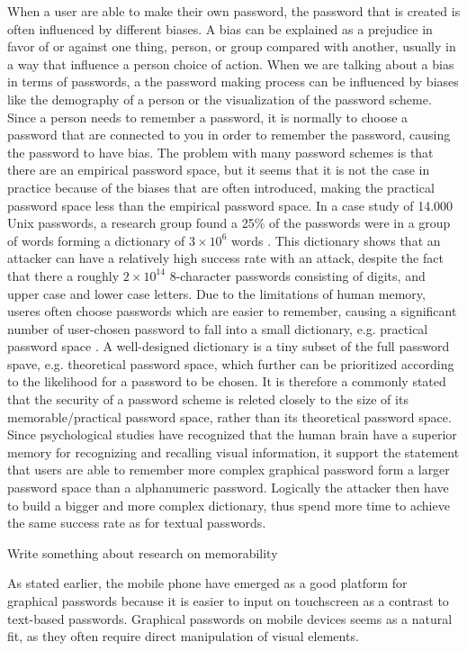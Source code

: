     When a user are able to make their own password, the password that is created is often influenced by different biases. A bias can be explained as a prejudice in favor of or against one thing, person, or group compared with another, usually in a way that influence a person choice of action. When we are talking about a bias in terms of passwords, a the password making process can be influenced by biases like the demography of a person or the visualization of the password scheme. Since a person needs to remember a password, it is normally to choose a password that are connected to you in order to remember the password, causing the password to have bias. The problem with many password schemes is that there are an empirical password space, but it seems that it is not the case in practice because of the biases that are often introduced, making the practical password space less than the empirical password space. In a case study of 14.000 Unix passwords, a research group found a 25\% of the passwords were in a group of words forming a dictionary of $3\times10^{6}$ words \cite{UnixPasswords}. This dictionary shows that an attacker can have a relatively high success rate with an attack, despite the fact that there a roughly $2\times10^{14}$ 8-character passwords consisting of digits, and upper case and lower case letters. Due to the limitations of human memory, useres often choose passwords which are easier to remember, causing a significant number of user-chosen password to fall into a small dictionary, e.g. practical password space \cite{Tao}. A well-designed dictionary is a tiny subset of the full password spave, e.g. theoretical password space, which further can be prioritized  according to the likelihood for a password to be chosen. It is therefore a commonly stated that the security of a password scheme is releted closely to the size of its memorable/practical password space, rather than its theoretical password space. Since psychological studies have recognized that the human brain have a superior memory for recognizing and recalling visual information, it support the statement that users are able to remember more complex graphical password form a larger password space than a alphanumeric password. Logically the attacker then have to build a bigger and more complex dictionary, thus spend more time to achieve the same success rate as for textual passwords. %




    Write something about research on memorability


    As stated earlier, the mobile phone have emerged as a good platform for graphical passwords because it is easier to input on touchscreen as a contrast to text-based passwords. Graphical passwords on mobile devices seems as a natural fit, as they often require direct manipulation of visual elements. 